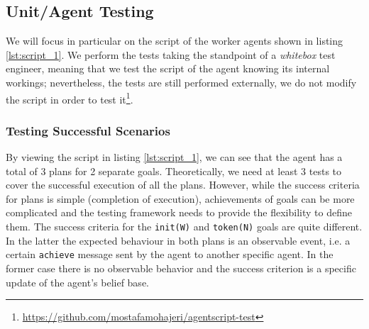 
\subsection{Unit/Agent Testing}
We will focus in particular on the script of the worker agents shown in listing \ref{lst:script_1}. We perform the tests taking the standpoint of a \textit{whitebox} test engineer, meaning that we test the script of the agent knowing its internal workings; nevertheless, the tests are still performed externally, we do not modify the script in order to test it\footnote{\url{https://github.com/mostafamohajeri/agentscript-test}}.

\subsubsection{Testing Successful Scenarios}
By viewing the script in listing \ref{lst:script_1}, we can see that the agent has a total of 3 plans for 2 separate goals. Theoretically, we need at least 3 tests to cover the successful execution of all the plans. However, while the success criteria for plans is simple (completion of execution), achievements of goals can be more complicated and the testing framework needs to provide the flexibility to define them. The success criteria for the \texttt{init(W)} and \texttt{token(N)} goals are quite different. In the latter the expected behaviour in both plans is an observable event, i.e. a certain \texttt{achieve} message sent by the agent to another specific agent. In the former case there is no observable behavior and the success criterion is a specific update of the agent's belief base.





